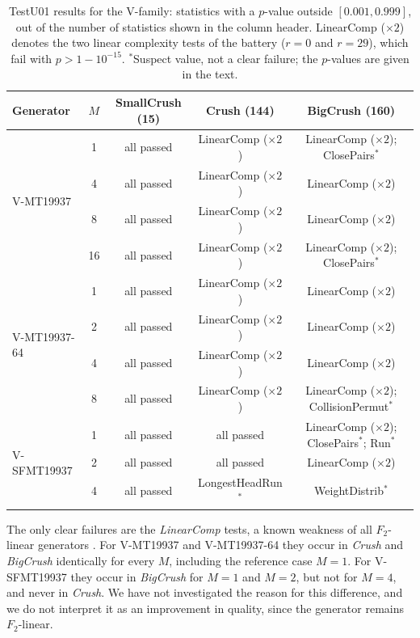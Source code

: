 \documentclass[preprint,1p,times]{elsarticle}
\begin{document}
\begin{table}[H]
	\centering
	\small
	\begin{tabular}{|l|c|c|c|c|}
		\hline
		\textbf{Generator} & $M$ & \textbf{SmallCrush} (15) & \textbf{Crush} (144) & \textbf{BigCrush} (160) \\
		\hline
		\multirow{4}{*}{V-MT19937}
		 & 1  & all passed & LinearComp ($\times 2$) & LinearComp ($\times 2$); ClosePairs$^{*}$ \\
		 & 4  & all passed & LinearComp ($\times 2$) & LinearComp ($\times 2$) \\
		 & 8  & all passed & LinearComp ($\times 2$) & LinearComp ($\times 2$) \\
		 & 16 & all passed & LinearComp ($\times 2$) & LinearComp ($\times 2$); ClosePairs$^{*}$ \\
		\hline
		\multirow{4}{*}{V-MT19937-64}
		 & 1  & all passed & LinearComp ($\times 2$) & LinearComp ($\times 2$) \\
		 & 2  & all passed & LinearComp ($\times 2$) & LinearComp ($\times 2$) \\
		 & 4  & all passed & LinearComp ($\times 2$) & LinearComp ($\times 2$) \\
		 & 8  & all passed & LinearComp ($\times 2$) & LinearComp ($\times 2$); CollisionPermut$^{*}$ \\
		\hline
		\multirow{3}{*}{V-SFMT19937}
		 & 1  & all passed & all passed & LinearComp ($\times 2$); ClosePairs$^{*}$; Run$^{*}$ \\
		 & 2  & all passed & all passed & LinearComp ($\times 2$) \\
		 & 4  & all passed & LongestHeadRun$^{*}$ & WeightDistrib$^{*}$ \\
		\hline
	\end{tabular}
	\caption{\label{table:testu01} TestU01 results for the V-family: statistics with a $p$-value outside $[0.001, 0.999]$, out of the number of statistics shown in the column header. LinearComp ($\times 2$) denotes the two linear complexity tests of the battery ($r=0$ and $r=29$), which fail with $p > 1-10^{-15}$. $^{*}$Suspect value, not a clear failure; the $p$-values are given in the text.}
\end{table}

The only clear failures are the \textit{LinearComp} tests, a known weakness of all $F_2$-linear generators \cite{testu01, multistream}. For V-MT19937 and V-MT19937-64 they occur in \textit{Crush} and \textit{BigCrush} identically for every $M$, including the reference case $M=1$. For V-SFMT19937 they occur in \textit{BigCrush} for $M=1$ and $M=2$, but not for $M=4$, and never in \textit{Crush}. We have not investigated the reason for this difference, and we do not interpret it as an improvement in quality, since the generator remains $F_2$-linear.
\end{document}
